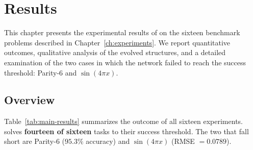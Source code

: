 
\chapter{Results}
\label{ch:results}

This chapter presents the experimental results of \modnet{} on the
sixteen benchmark problems described in Chapter~\ref{ch:experiments}.
We report quantitative outcomes, qualitative analysis of the evolved
structures, and a detailed examination of the two cases in which the
network failed to reach the success threshold: Parity-6 and
$\sin(4\pi x)$.

\section{Overview}
\label{sec:results-overview}

Table~\ref{tab:main-results} summarizes the outcome of all sixteen
experiments. \modnet{} solves \textbf{fourteen of sixteen} tasks to
their success threshold. The two that fall short are Parity-6
($95.3\%$ accuracy) and $\sin(4\pi x)$ (RMSE $= 0.0789$).

